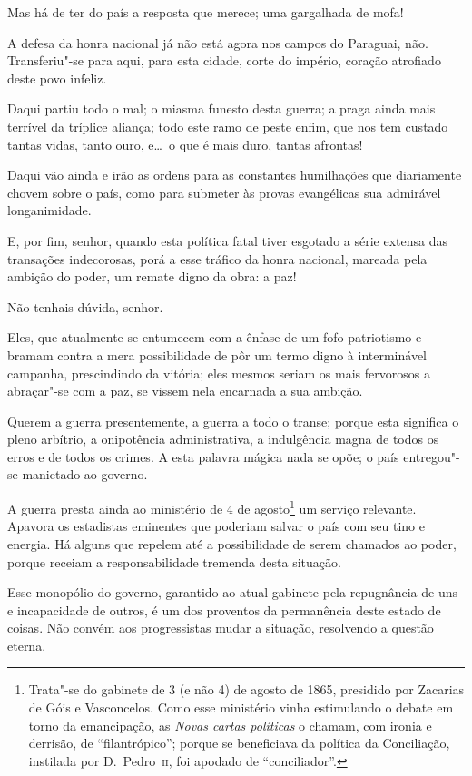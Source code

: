 Mas há de ter do país a resposta que merece; uma gargalhada de mofa!

 A defesa da honra nacional já não está agora nos campos do Paraguai,
não. Transferiu"-se para aqui, para esta cidade, corte do império,
coração atrofiado deste povo infeliz. 

 Daqui partiu todo o mal; o miasma funesto desta guerra; a praga ainda
mais terrível da tríplice aliança; todo este ramo de peste enfim, que
nos tem custado tantas vidas, tanto ouro, e\ldots\ o que é mais duro,
tantas afrontas!

 Daqui vão ainda e irão as ordens para as constantes humilhações que
diariamente chovem sobre o país, como para submeter às provas
evangélicas sua admirável longanimidade.

 E, por fim, senhor, quando esta política fatal tiver esgotado a série
extensa das transações indecorosas, porá a esse tráfico da honra
nacional, mareada pela ambição do poder, um remate digno da obra: a paz!

 Não tenhais dúvida, senhor.

 Eles, que atualmente se entumecem com a ênfase de um fofo patriotismo e
bramam contra a mera possibilidade de pôr um termo digno à interminável
campanha, prescindindo da vitória; eles mesmos seriam os mais
fervorosos a abraçar"-se com a paz, se vissem nela encarnada a sua
ambição. 

 Querem a guerra presentemente, a guerra a todo o transe; porque esta
significa o pleno arbítrio, a onipotência administrativa, a indulgência
magna de todos os erros e de todos os crimes. A esta palavra mágica
nada se opõe; o país entregou"-se manietado ao governo.

 A guerra presta ainda ao ministério de 4 de
agosto\footnote{ Trata"-se do gabinete de 3 (e não 4) de agosto de 1865, presidido por 
Zacarias de Góis e Vasconcelos. Como esse ministério vinha estimulando o debate em torno da 
emancipação, as \textit{Novas cartas políticas} o chamam, com ironia e derrisão, de ``filantrópico''; porque se 
beneficiava da política da Conciliação, instilada por D.~Pedro~\textsc{ii}, foi apodado de ``conciliador''.} 
um serviço relevante. Apavora os estadistas eminentes que poderiam
salvar o país com seu tino e energia. Há alguns que repelem até a
possibilidade de serem chamados ao poder, porque receiam a
responsabilidade tremenda desta situação. 

 Esse monopólio do governo, garantido ao atual gabinete pela repugnância
de uns e incapacidade de outros, é um dos proventos da permanência
deste estado de coisas. Não convém aos progressistas mudar a situação,
resolvendo a questão eterna. 

